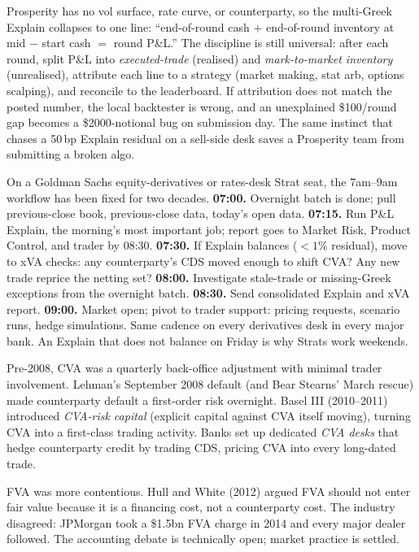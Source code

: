 \begin{prosperitybox}[title={Prosperity example: per-round P\&L Explain is trivial}]
Prosperity has no vol surface, rate curve, or counterparty, so the
multi-Greek Explain collapses to one line: ``end-of-round cash
$+$ end-of-round inventory at mid $-$ start cash $=$ round P\&L.''
The discipline is still universal: after each round, split P\&L
into \emph{executed-trade} (realised) and \emph{mark-to-market
inventory} (unrealised), attribute each line to a strategy (market
making, stat arb, options scalping), and reconcile to the
leaderboard.  If attribution does not match the posted number, the
local backtester is wrong, and an unexplained \$100/round gap
becomes a \$2000-notional bug on submission day.  The same
instinct that chases a 50\,bp Explain residual on a sell-side desk
saves a Prosperity team from submitting a broken algo.
\end{prosperitybox}

\begin{gsbox}
On a Goldman Sachs equity-derivatives or rates-desk Strat seat,
the 7am--9am workflow has been fixed for two decades.
\textbf{07:00.}  Overnight batch is done; pull previous-close
book, previous-close data, today's open data.  \textbf{07:15.}
Run P\&L Explain, the morning's most important job; report
goes to Market Risk, Product Control, and trader by 08:30.
\textbf{07:30.}  If Explain balances ($< 1\%$ residual), move to
xVA checks: any counterparty's CDS moved enough to shift CVA?  Any
new trade reprice the netting set?  \textbf{08:00.}  Investigate
stale-trade or missing-Greek exceptions from the overnight batch.
\textbf{08:30.}  Send consolidated Explain and xVA report.
\textbf{09:00.}  Market open; pivot to trader support: pricing
requests, scenario runs, hedge simulations.  Same cadence on every
derivatives desk in every major bank.  An Explain that does not
balance on Friday is why Strats work weekends.
\end{gsbox}

\begin{historybox}[title={Historical note: from accounting afterthought to trillion-dollar business}]
Pre-2008, CVA was a quarterly back-office adjustment with minimal
trader involvement.  Lehman's September 2008 default (and
Bear Stearns' March rescue) made counterparty default a
first-order risk overnight.  Basel III (2010--2011) introduced
\emph{CVA-risk capital} (explicit capital against CVA itself
moving), turning CVA into a first-class trading activity.  Banks
set up dedicated \emph{CVA desks} that hedge counterparty credit
by trading CDS, pricing CVA into every long-dated trade.

FVA was more contentious.  Hull and White (2012)
\citep{hullwhite2012fva} argued FVA should not enter fair value
because it is a financing cost, not a counterparty cost.  The
industry disagreed: JPMorgan took a \$1.5bn FVA charge in 2014 and
every major dealer followed.  The accounting debate is technically
open; market practice is settled.
\end{historybox}
